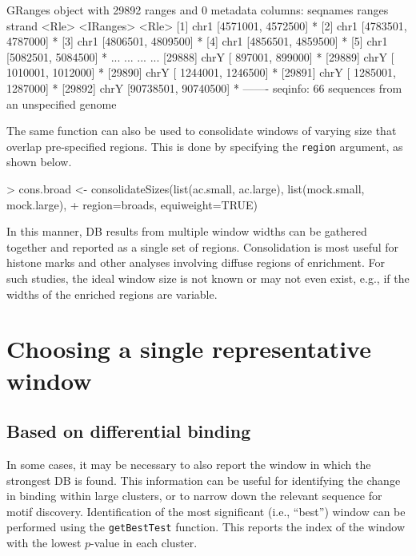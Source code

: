 \documentclass[12pt]{report}
\renewenvironment{Schunk}{\vspace{0pt}}{\vspace{0pt}}
\newcommand{\code}[1]{{\small\texttt{#1}}}
\begin{document}
\begin{Schunk}
\begin{Soutput}
GRanges object with 29892 ranges and 0 metadata columns:
          seqnames               ranges strand
             <Rle>            <IRanges>  <Rle>
      [1]     chr1   [4571001, 4572500]      *
      [2]     chr1   [4783501, 4787000]      *
      [3]     chr1   [4806501, 4809500]      *
      [4]     chr1   [4856501, 4859500]      *
      [5]     chr1   [5082501, 5084500]      *
      ...      ...                  ...    ...
  [29888]     chrY [  897001,   899000]      *
  [29889]     chrY [ 1010001,  1012000]      *
  [29890]     chrY [ 1244001,  1246500]      *
  [29891]     chrY [ 1285001,  1287000]      *
  [29892]     chrY [90738501, 90740500]      *
  -------
  seqinfo: 66 sequences from an unspecified genome
\end{Soutput}
\end{Schunk}

The same function can also be used to consolidate windows of varying size that overlap pre-specified regions.
This is done by specifying the \code{region} argument, as shown below.

\begin{Schunk}
\begin{Sinput}
> cons.broad <- consolidateSizes(list(ac.small, ac.large), list(mock.small, mock.large), 
+     region=broads, equiweight=TRUE)
\end{Sinput}
\end{Schunk}

In this manner, DB results from multiple window widths can be gathered together and reported as a single set of regions.
Consolidation is most useful for histone marks and other analyses involving diffuse regions of enrichment.
For such studies, the ideal window size is not known or may not even exist, e.g., if the widths of the enriched regions are variable.

\section{Choosing a single representative window}

\subsection{Based on differential binding}
In some cases, it may be necessary to also report the window in which the strongest DB is found.
This information can be useful for identifying the change in binding within large clusters, or to narrow down the relevant sequence for motif discovery.
Identification of the most significant (i.e., ``best'') window can be performed using the \code{getBestTest} function.
This reports the index of the window with the lowest $p$-value in each cluster.
\end{document}
